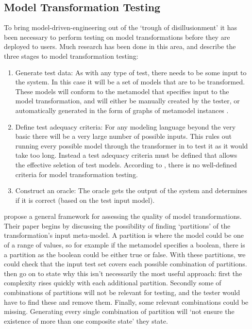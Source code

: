 \subsection{Model Transformation Testing}

To bring model-driven-engineering out of the `trough of disillusionment' it has been necessary to perform testing on model transformations before they are deployed to users. Much research has been done in this area, and \citet{mttBarriers} describe the three stages to model transformation testing:

\begin{enumerate}
	\item Generate test data: As with any type of test, there needs to be some input to the system. In this case it will be a set of models that are to be transformed. These models will conform to the metamodel that specifies input to the model transformation, and will either be manually created by the tester, or automatically generated in the form of graphs of metamodel instances \citep{mttBarriers}.
	\item Define test adequacy criteria: For any modeling language beyond the very basic there will be a very large number of possible inputs. This rules out running every possible model through the transformer in to test it as it would take too long. Instead a test adequacy criteria must be defined that allows the effective seletion of test models. According to \citet{mttBarriers}, there is no well-defined criteria for model transformation testing.
	\item Construct an oracle: The oracle gets the output of the system and determines if it is correct (based on the test input model).
\end{enumerate}

\citet{fleureyMTInputs} propose a general framework for assessing the quality of model transformations. Their paper begins by discussing the possibility of finding `partitions' of the transformation's input meta-model. A partition is where the model could be one of a range of values, so for example if the metamodel specifies a boolean, there is a partition as the boolean could be either true or false. With these partitions, we could check that the input test set covers each possible combination of partitions. \citet{fleureyMTInputs} then go on to state why this isn't necessarily the most useful approach: first the complexity rises quickly with each additional partition. Secondly some of combinations of partitions will not be relevant for testing, and the tester would have to find these and remove them. Finally, some relevant combinations could be missing. Generating every single combination of partition will `not ensure the existence of more than one composite state' they state.

